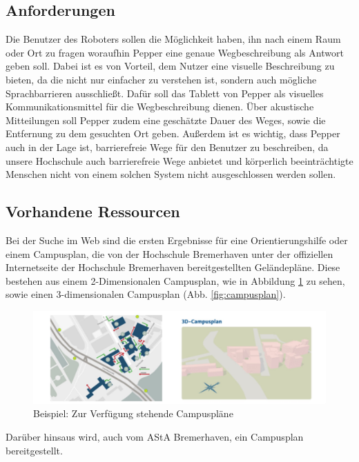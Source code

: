 \subsection{Anforderungen}
Die Benutzer des Roboters sollen die Möglichkeit haben, ihn nach einem Raum oder Ort zu fragen woraufhin Pepper eine genaue Wegbeschreibung als Antwort geben soll. Dabei ist es von Vorteil, dem Nutzer eine visuelle Beschreibung zu bieten, da die nicht nur einfacher zu verstehen ist, sondern auch mögliche Sprachbarrieren ausschließt. Dafür soll das Tablett von Pepper als visuelles Kommunikationsmittel für die Wegbeschreibung dienen. Über akustische Mitteilungen soll Pepper zudem eine geschätzte Dauer des Weges, sowie die Entfernung zu dem gesuchten Ort geben. Außerdem ist es wichtig, dass Pepper auch in der Lage ist, barrierefreie Wege für den Benutzer zu beschreiben, da unsere Hochschule auch barrierefreie Wege anbietet und körperlich beeinträchtigte Menschen nicht von einem solchen System nicht ausgeschlossen werden sollen.\\

\subsection{Vorhandene Ressourcen}
Bei der Suche im Web sind die ersten Ergebnisse für eine Orientierungshilfe oder einem Campusplan, die von der Hochschule Bremerhaven unter der offiziellen Internetseite der Hochschule Bremerhaven bereitgestellten Geländepläne. Diese bestehen aus einem 2-Dimensionalen Campusplan, wie in Abbildung \ref{fig:campus-integration} zu sehen, sowie einen 3-dimensionalen Campusplan (Abb. \ref{fig:campusplan}).\\

\begin{figure}[H]
    \includegraphics[width=\textwidth]{Figures/3DNavigator/campusplan_bsp.jpg}
    \caption{Beispiel: Zur Verfügung stehende Campuspläne}
    \label{fig:campus-integration}
    \centering
\end{figure}

Darüber hinsaus wird, auch vom AStA Bremerhaven, ein Campusplan bereitgestellt.\\

